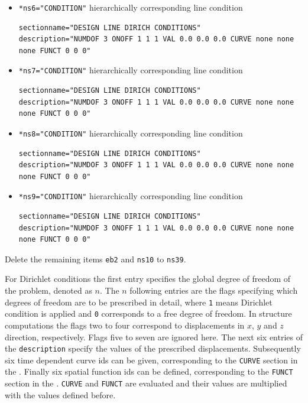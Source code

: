 \begin{itemize}
 \item \verb|*ns6="CONDITION"| \qquad hierarchically corresponding line condition
 \begin{small} \begin{verbatim}
sectionname="DESIGN LINE DIRICH CONDITIONS"
description="NUMDOF 3 ONOFF 1 1 1 VAL 0.0 0.0 0.0 CURVE none none none FUNCT 0 0 0"
 \end{verbatim} \end{small}

 \item \verb|*ns7="CONDITION"| \qquad hierarchically corresponding line condition
 \begin{small} \begin{verbatim}
sectionname="DESIGN LINE DIRICH CONDITIONS"
description="NUMDOF 3 ONOFF 1 1 1 VAL 0.0 0.0 0.0 CURVE none none none FUNCT 0 0 0"
 \end{verbatim} \end{small}

 \item \verb|*ns8="CONDITION"| \qquad hierarchically corresponding line condition
 \begin{small} \begin{verbatim}
sectionname="DESIGN LINE DIRICH CONDITIONS"
description="NUMDOF 3 ONOFF 1 1 1 VAL 0.0 0.0 0.0 CURVE none none none FUNCT 0 0 0"
 \end{verbatim} \end{small}

 \item \verb|*ns9="CONDITION"| \qquad hierarchically corresponding line condition
 \begin{small} \begin{verbatim}
sectionname="DESIGN LINE DIRICH CONDITIONS"
description="NUMDOF 3 ONOFF 1 1 1 VAL 0.0 0.0 0.0 CURVE none none none FUNCT 0 0 0"
 \end{verbatim} \end{small}

\end{itemize}

Delete the remaining items \verb|eb2| and \verb|ns10| to \verb|ns39|. \newline

For Dirichlet conditions the first entry specifies the global degree of freedom of the problem, denoted as $n$. The $n$ following entries are the flags specifying which degrees of freedom are to be prescribed in detail, where \verb|1| means Dirichlet condition is applied and \verb|0| corresponds to a free degree of freedom. In structure computations the flags two to four correspond to displacements in $x$, $y$ and $z$ direction, respectively. Flags five to seven are ignored here. The next six entries of the \verb|description| specify the values of the prescribed displacements. Subsequently six time dependent curve ids can be given, corresponding to the \verb|CURVE| section in the \head. Finally six spatial function ids can be defined, corresponding to the \verb|FUNCT| section in the \head. \verb|CURVE| and \verb|FUNCT| are evaluated and their values are multiplied with the values defined before. \newline

